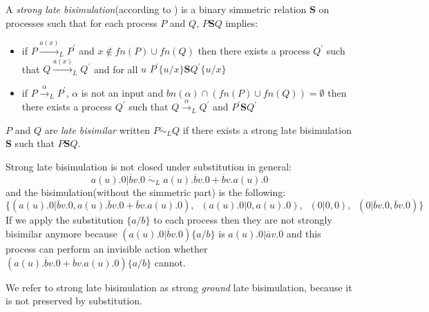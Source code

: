 \begin{definition}
  A \emph{strong late bisimulation}(according to \cite{parrow}) is a binary simmetric relation $\mathbf{S}$ on processes such that for each process $P$ and $Q$, $P\mathbf{S}Q$ implies:
  \begin{itemize}
    \item
      if $P \xrightarrow{a(x)}_{L} P^{'}$ and $x\notin fn(P)\cup fn(Q)$ then there exists a process $Q^{'}$ such that $Q \xrightarrow{a(x)}_{L} Q^{'}$ and for all $u$ $P^{'}\{u/x\}\mathbf{S}Q^{'}\{u/x\}$
    \item 
      if $P \xrightarrow{\alpha}_{L} P^{'}$, $\alpha$ is not an input and $bn(\alpha) \cap (fn(P)\cup fn(Q)) = \emptyset$ then there exists a process $Q^{'}$ such that $Q \xrightarrow{\alpha}_{L} Q^{'}$ and $P^{'}\mathbf{S}Q^{'}$
  \end{itemize}
  $P$ and $Q$ are \emph{late bisimilar} written $P\dot{\sim}_{L}Q$ if there exists a strong late bisimulation $\mathbf{S}$ such that $P\mathbf{S}Q$.
\end{definition}

\begin{example}
  Strong late bisimulation is not closed under substitution in general:
  \[
    a(u).0|\overline{b}v.0\; \dot{\sim}_{L}\; a(u).\overline{b}v.0 + \overline{b}v.a(u).0
  \]
  and the bisimulation(without the simmetric part) is  the following:
  \[
    \{(a(u).0|\overline{b}v.0, a(u).\overline{b}v.0 + \overline{b}v.a(u).0),\;\; (a(u).0|0,a(u).0),\;\; (0|0,0),\;\; (0|\overline{b}v.0,\overline{b}v.0)\} 
  \]
  If we apply the substitution $\{a/b\}$ to each process then they are not strongly bisimilar anymore because $(a(u).0|\overline{b}v.0)\{a/b\}$ is $a(u).0|\overline{a}v.0$ and this process can perform an invisible action whether $(a(u).\overline{b}v.0 + \overline{b}v.a(u).0)\{a/b\}$ cannot.
\end{example}

We refer to strong late bisimulation as strong \emph{ground} late bisimulation, because it is not preserved by substitution.


